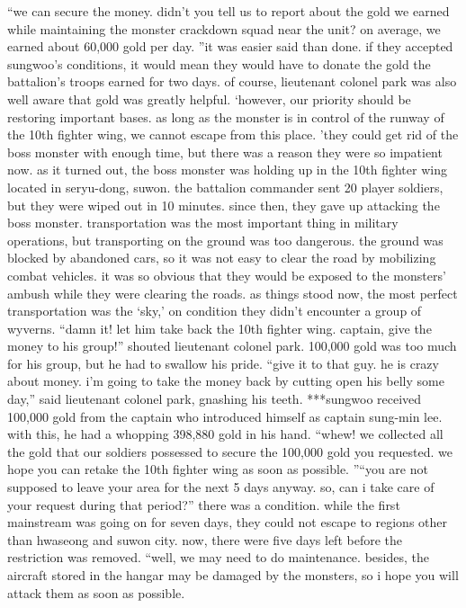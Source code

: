 “we can secure the money.
 didn’t you tell us to report about the gold we earned while maintaining the monster crackdown squad near the unit? on average, we earned about 60,000 gold per day.
”it was easier said than done.
if they accepted sungwoo’s conditions, it would mean they would have to donate the gold the battalion’s troops earned for two days.
 of course, lieutenant colonel park was also well aware that gold was greatly helpful.
‘however, our priority should be restoring important bases.
 as long as the monster is in control of the runway of the 10th fighter wing, we cannot escape from this place.
’they could get rid of the boss monster with enough time, but there was a reason they were so impatient now.
 as it turned out, the boss monster was holding up in the 10th fighter wing located in seryu-dong, suwon.
the battalion commander sent 20 player soldiers, but they were wiped out in 10 minutes.
 since then, they gave up attacking the boss monster.
transportation was the most important thing in military operations, but transporting on the ground was too dangerous.
 the ground was blocked by abandoned cars, so it was not easy to clear the road by mobilizing combat vehicles.
 it was so obvious that they would be exposed to the monsters’ ambush while they were clearing the roads.
as things stood now, the most perfect transportation was the ‘sky,’ on condition they didn’t encounter a group of wyverns.
“damn it! let him take back the 10th fighter wing.
 captain, give the money to his group!” shouted lieutenant colonel park.
100,000 gold was too much for his group, but he had to swallow his pride.
“give it to that guy.
 he is crazy about money.
 i’m going to take the money back by cutting open his belly some day,” said lieutenant colonel park, gnashing his teeth.
***sungwoo received 100,000 gold from the captain who introduced himself as captain sung-min lee.
 with this, he had a whopping 398,880 gold in his hand.
“whew! we collected all the gold that our soldiers possessed to secure the 100,000 gold you requested.
 we hope you can retake the 10th fighter wing as soon as possible.
”“you are not supposed to leave your area for the next 5 days anyway.
 so, can i take care of your request during that period?”
there was a condition.
 while the first mainstream was going on for seven days, they could not escape to regions other than hwaseong and suwon city.
 now, there were five days left before the restriction was removed.
“well, we may need to do maintenance.
 besides, the aircraft stored in the hangar may be damaged by the monsters, so i hope you will attack them as soon as possible.
